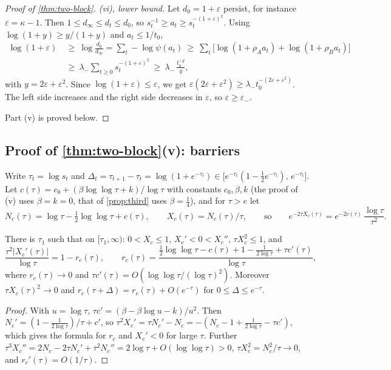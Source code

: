\begin{proof}[Proof of \cref{thm:two-block}]
\emph{(vi), lower bound.} Let $d_0=1+\varepsilon$ persist, for instance $\varepsilon=\kappa-1$. Then $1\le d_\infty\le d_t\le d_0$, so
$s_t^{-1}\ge a_t\ge s_t^{-(1+\varepsilon)^2}$. Using $\log(1+y)\ge y/(1+y)$ and $a_t\le1/t_0$,
\begin{align*}
\log(1+\varepsilon)\ &\ge\ \log\frac{d_0}{d_\infty}=\sum_t-\log\psi(a_t)\ \ge\ \sum_t\big[\log(1+\rho_Aa_t)+\log(1+\rho_Ba_t)\big]\\
&\ge\ \lambda_-\sum_{t\ge0}s_t^{-(1+\varepsilon)^2}\ \ge\ \lambda_-\,\frac{t_0^{-y}}{y},
\end{align*}
with $y=2\varepsilon+\varepsilon^2$. Since $\log(1+\varepsilon)\le\varepsilon$, we get $\varepsilon(2\varepsilon+\varepsilon^2)\ge\lambda_-t_0^{-(2\varepsilon+\varepsilon^2)}$. The left
side increases and the right side decreases in $\varepsilon$, so $\varepsilon\ge\varepsilon_-$.

Part (v) is proved below.
\end{proof}

\subsection{Proof of \cref{thm:two-block}(v): barriers}\label{app:second}

Write $\tau_t=\log s_t$ and $\Delta_t=\tau_{t+1}-\tau_t=\log(1+e^{-\tau_t})\in\big[e^{-\tau_t}(1-\tfrac12e^{-\tau_t}),\,e^{-\tau_t}\big]$. Let
$c(\tau)=c_0+(\beta\log\log\tau+k)/\log\tau$ with constants $c_0,\beta,k$ (the proof of (v) uses $\beta=k=0$, that of \cref{prop:third}
uses $\beta=\frac14$), and for $\tau>e$ let
\[
N_c(\tau)=\log\tau-\tfrac12\log\log\tau+c(\tau),\qquad X_c(\tau)=N_c(\tau)/\tau,\qquad\text{so}\qquad
e^{-2\tau X_c(\tau)}=e^{-2c(\tau)}\,\frac{\log\tau}{\tau^2}. \tag{$*$}
\]

\begin{lemma}\label{lem:barrier}
There is $\tau_1$ such that on $[\tau_1,\infty)$: $0<X_c\le1$, $X_c'<0<X_c''$, $\tau X_c^2\le1$, and
\[
\frac{\tau^2|X_c'(\tau)|}{\log\tau}=1-r_c(\tau),\qquad r_c(\tau)=\frac{\frac12\log\log\tau-c(\tau)+1-\frac1{2\log\tau}+\tau c'(\tau)}{\log\tau},
\]
where $r_c(\tau)\to0$ and $\tau c'(\tau)=O(\log\log\tau/(\log\tau)^2)$. Moreover $\tau X_c(\tau)^2\to0$ and $r_c(\tau+\Delta)=r_c(\tau)+O(e^{-\tau})$ for $0\le\Delta\le e^{-\tau}$.
\end{lemma}
\begin{proof}
With $u=\log\tau$, $\tau c'=(\beta-\beta\log u-k)/u^2$. Then $N_c'=(1-\frac1{2\log\tau})/\tau+c'$, so
$\tau^2X_c'=\tau N_c'-N_c=-(N_c-1+\frac1{2\log\tau}-\tau c')$, which gives the formula for $r_c$ and $X_c'<0$ for large $\tau$. Further
$\tau^3X_c''=2N_c-2\tau N_c'+\tau^2N_c''=2\log\tau+O(\log\log\tau)>0$, $\tau X_c^2=N_c^2/\tau\to0$, and $r_c'(\tau)=O(1/\tau)$.
\end{proof}

